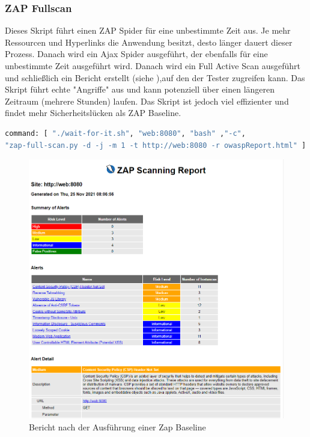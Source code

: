 \subsubsection{ZAP Fullscan}


Dieses Skript führt einen ZAP Spider für eine unbestimmte Zeit aus.
Je mehr Ressourcen und Hyperlinks die Anwendung besitzt, desto länger
dauert dieser Prozess. Danach wird ein Ajax Spider ausgeführt, der
ebenfalls für eine unbestimmte Zeit ausgeführt wird. Danach wird ein
Full Active Scan ausgeführt und schließlich ein Bericht erstellt
(siehe ),auf  den der Tester zugreifen kann.
Das Skript führt echte "Angriffe" aus  und kann potenziell über einen
längeren Zeitraum (mehrere Stunden) laufen. Das Skript ist jedoch viel
effizienter und findet mehr  Sicherheitslücken als ZAP Baseline.

\begin{lstlisting}[language=Dockerfile,label={lst:fullscan},caption={ZAP Fullscan Ausführungsbefehl}]
command: [ "./wait-for-it.sh", "web:8080", "bash" ,"-c",
"zap-full-scan.py -d -j -m 1 -t http://web:8080 -r owaspReport.html" ]

\end{lstlisting}


\begin{figure}[H]
    \centering
    \includegraphics[scale=0.5]{images/zap-report}
    \caption{Bericht nach der Ausführung einer Zap Baseline} \label{fig:baseline}
\end{figure}
